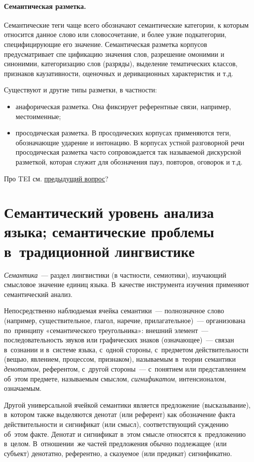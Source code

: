 \documentclass[12pt]{article}
\theoremstyle{definition}
\theoremstyle{remark}
\numberwithin{equation}{section}
\begin{document}
\paragraph{Семантическая разметка.} Семантические теги чаще всего обозначают семантические категории, к которым относится данное слово или словосочетание, и более узкие подкатегории, специфицирующие его значение. Семантическая разметка корпусов предусматривает спе цификацию значения слов, разрешение омонимии и синонимии, категоризацию слов (разряды), выделение тематических классов, признаков каузативности, оценочных и деривационных характеристик и т.д.

Существуют и другие типы разметки, в частности:
\begin{itemize}
\item анафорическая разметка. Она фиксирует референтные связи, например, местоименные;
\item просодическая разметка. В просодических корпусах применяются теги, обозначающие ударение и интонацию. В корпусах устной разговорной речи просодическая разметка часто сопровождается так называемой дискурсной разметкой, которая служит для обозначения пауз, повторов, оговорок и т.д.
\end{itemize}

Про TEI см. \hyperref[sec:TEI]{предыдущий вопрос}?

\section{Семантический уровень анализа языка; семантические проблемы в~традиционной лингвистике}
\textsl{Семантика}~--- раздел лингвистики (в частности, семиотики),
изучающий смысловое значение единиц языка. В~качестве инструмента
изучения применяют семантический анализ.

Непосредственно наблюдаемая ячейка семантики~--- полнозначное слово
(например, существительное, глагол, наречие, прилагательное)~---
организована по~принципу «семантического треугольника»: внешний
элемент~--- последовательность звуков или графических знаков
(означающее)~--- связан в~сознании и в~системе языка, с~одной стороны,
с~предметом действительности (вещью, явлением, процессом, признаком),
называемым в~теории семантики {\sl денотатом}, референтом, с~другой стороны~---
с~понятием или представлением об~этом предмете, называемым смыслом,
{\sl сигнификатом}, интенсионалом, означаемым.

Другой универсальной ячейкой семантики является предложение (высказывание),
в~котором также выделяются денотат (или референт) как обозначение факта
действительности и сигнификат (или смысл), соответствующий суждению об~этом
факте. Денотат и сигнификат в~этом смысле относятся к~предложению в~целом.
В~отношении~же частей предложения обычно подлежащее (или субъект) денотатно,
референтно, а сказуемое (или предикат) сигнификатно.
\end{document}
